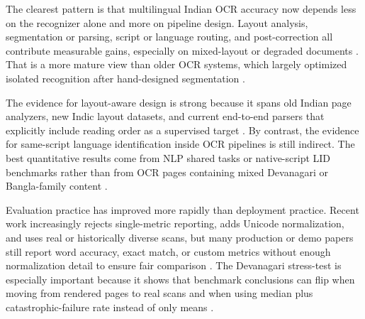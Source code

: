     
    The clearest pattern is that multilingual Indian OCR accuracy now depends less on the recognizer alone and more on pipeline design. Layout analysis, segmentation or parsing, script or language routing, and post-correction all contribute measurable gains, especially on mixed-layout or degraded documents  \cite{Faraz2026Designing} \cite{Li2025Printed} \cite{Tulsyan2024IndicOCR:} \cite{Bhandari2026A}. That is a more mature view than older OCR systems, which largely optimized isolated recognition after hand-designed segmentation  \cite{Sahare2018Multilingual} \cite{Mishra2014WORD} \cite{Ashwin2002A}.
    
    
    The evidence for layout-aware design is strong because it spans old Indian page analyzers, new Indic layout datasets, and current end-to-end parsers that explicitly include reading order as a supervised target  \cite{Chaudhuri2002Page} \cite{Nath2025IndicDLP:} \cite{Wang2025Infinity} \cite{Li2026Structure-Aware}. By contrast, the evidence for same-script language identification inside OCR pipelines is still indirect. The best quantitative results come from NLP shared tasks or native-script LID benchmarks rather than from OCR pages containing mixed Devanagari or Bangla-family content  \cite{Madhani2023Bhasa-Abhijnaanam:} \cite{Manukonda2025byteSizedLLM@NLU} \cite{Thapa2025Natural}.
    
    
    Evaluation practice has improved more rapidly than deployment practice. Recent work increasingly rejects single-metric reporting, adds Unicode normalization, and uses real or historically diverse scans, but many production or demo papers still report word accuracy, exact match, or custom metrics without enough normalization detail to ensure fair comparison  \cite{Singh2026Can} \cite{Caravani2026Assessing} \cite{Tulsyan2020A} \cite{Faraz2026Designing} \cite{Zulkarnain2023bbOCR:}. The Devanagari stress-test is especially important because it shows that benchmark conclusions can flip when moving from rendered pages to real scans and when using median plus catastrophic-failure rate instead of only means  \cite{Singh2026Can}.
    

